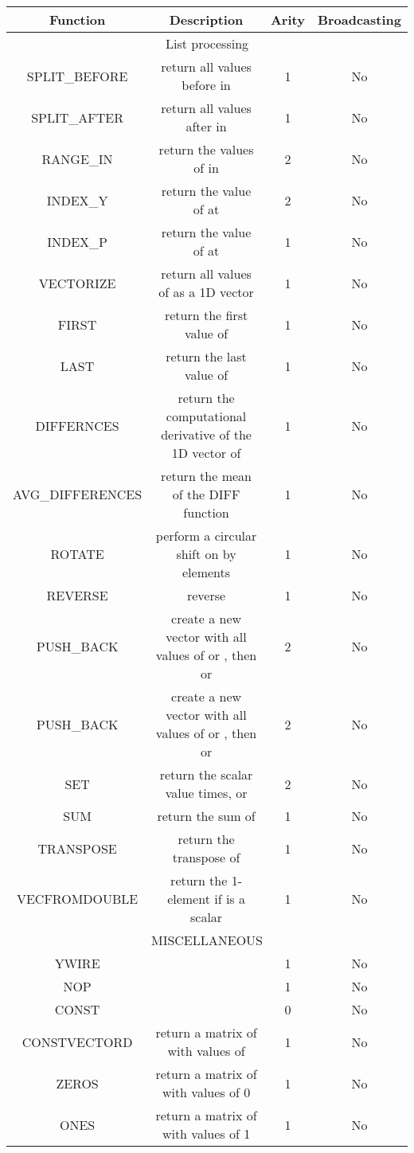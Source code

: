 \documentclass[sigconf,screen]{acmart}\settopmatter{printfolios=true,printacmref=false}
\begin{document}
\begin{table*}[t]
  \begin{tabular}{|c|c|c|c|}
    \hline
Function & Description & Arity & Broadcasting\\\hline
\multicolumn{4}{|c|}{List processing}\\\hline
SPLIT\_BEFORE & return all values before  in  & 1 & No\\
SPLIT\_AFTER & return all values after  in  & 1 & No\\
RANGE\_IN & return the values of  in  & 2 & No\\
INDEX\_Y & return the value of  at  & 2 & No\\
INDEX\_P & return the value of  at  & 1 & No\\
VECTORIZE & return all values of  as a 1D vector & 1 & No\\
FIRST & return the first value of  & 1 & No\\
LAST & return the last value of  & 1 & No\\
DIFFERNCES & return the computational derivative of the 1D vector of  & 1 & No\\
AVG\_DIFFERENCES & return the mean of the DIFF function & 1 & No\\
ROTATE & perform a circular shift on  by  elements & 1 & No\\
REVERSE & reverse  & 1 & No\\
PUSH\_BACK & create a new vector with all values of  or , then  or  & 2 & No\\
PUSH\_BACK & create a new vector with all values of  or , then  or  & 2 & No\\
SET & return the scalar value   times, or   & 2 & No\\
SUM & return the sum of  & 1 & No\\
TRANSPOSE & return the transpose of  & 1 & No\\
VECFROMDOUBLE & return the 1-element  if  is a scalar & 1 & No\\
\hline
\multicolumn{4}{|c|}{MISCELLANEOUS}\\\hline
YWIRE &  & 1 & No\\
NOP &  & 1 & No\\
CONST &  & 0 & No\\
CONSTVECTORD & return a matrix of  with values of  & 1 & No\\
ZEROS & return a matrix of  with values of 0 & 1 & No\\
ONES & return a matrix of  with values of 1 & 1 & No\\
\hline
  \end{tabular}
  \caption{List processing and other functions in the function set. The choice
    of many of these functions was inspired by MT-CGP \cite{Harding2012}.}
  \label{tab:list_functions}
\end{table*}
\end{document}
